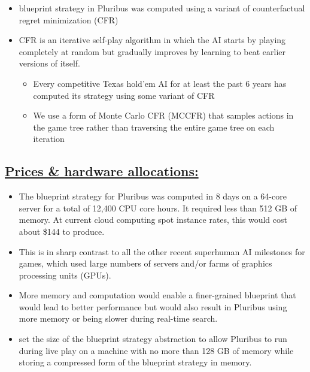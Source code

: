 \documentclass[
]{article}
\begin{document}
\begin{itemize}
\item
  blueprint strategy in Pluribus was computed using a variant of
  counterfactual regret minimization (CFR)
\item
  CFR is an iterative self-play algorithm in which the AI starts by
  playing completely at random but gradually improves by learning to
  beat earlier versions of itself.

  \begin{itemize}
  \item
    Every competitive Texas hold'em AI for at least the past 6 years has
    computed its strategy using some variant of CFR
  \item
    We use a form of Monte Carlo CFR (MCCFR) that samples actions in the
    game tree rather than traversing the entire game tree on each
    iteration
  \end{itemize}
\end{itemize}

\subsection{\texorpdfstring{\textbf{\ul{Prices \& hardware
allocations:}}}{Prices \& hardware allocations:}}\label{prices-hardware-allocations}

\begin{itemize}
\item
  The blueprint strategy for Pluribus was computed in 8 days on a
  64-core server for a total of 12,400 CPU core hours. It required less
  than 512 GB of memory. At current cloud computing spot instance rates,
  this would cost about \$144 to produce.
\item
  This is in sharp contrast to all the other recent superhuman AI
  milestones for games, which used large numbers of servers and/or farms
  of graphics processing units (GPUs).
\item
  More memory and computation would enable a finer-grained blueprint
  that would lead to better performance but would also result in
  Pluribus using more memory or being slower during real-time search.
\item
  set the size of the blueprint strategy abstraction to allow Pluribus
  to run during live play on a machine with no more than 128 GB of
  memory while storing a compressed form of the blueprint strategy in
  memory.
\end{itemize}
\end{document}

